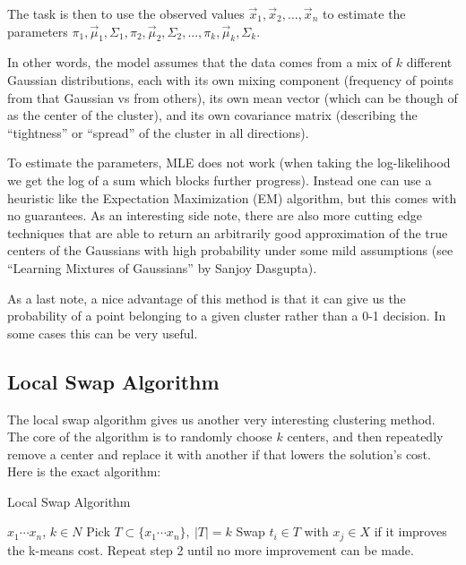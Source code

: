   The task is then to use the observed values $\vec{x}_1, \vec{x}_2, \dots, \vec{x}_n$ to
  estimate the parameters $\pi_1, \vec{\mu}_1, \Sigma_1, \pi_2, \vec{\mu}_2, {\Sigma_2}, ..., \pi_k, \vec{\mu}_k, {\Sigma_k}$.
  
  In other words, the model assumes that the data comes from a mix of $k$ different Gaussian distributions, each with its own mixing component (frequency of points from that
  Gaussian vs from others), its own mean vector (which can be though of as the center of the cluster), and its own covariance matrix (describing the ``tightness'' or ``spread'' of the 
  cluster in all directions).
  
  To estimate the parameters, MLE does not work (when taking the log-likelihood we get the log of a sum which blocks further progress). Instead one can use a heuristic like the 
  Expectation Maximization (EM) algorithm, but this comes with no guarantees. 
  As an interesting side note, there are also more cutting edge techniques that are able to return an arbitrarily good approximation of the true centers 
  of the Gaussians 
  with high probability under some mild assumptions (see ``Learning Mixtures of Gaussians'' by Sanjoy Dasgupta).
  
  As a last note, a nice advantage of this method is that it can give us the probability of a point belonging to a given cluster rather than a 0-1 decision. In some cases this can be very useful.

\subsection{Local Swap Algorithm}	
	The local swap algorithm gives us another very interesting clustering method. The core of the algorithm is to randomly choose $k$ centers,
  and then repeatedly remove a center and replace it with another if that lowers the solution's cost. Here is the exact
  algorithm:
	
\begin{algorithm}[H]
  \caption{Local Swap Algorithm}
  \label{ladder-mechanism}
  \begin{algorithmic}[1]
    \renewcommand\algorithmicrequire{\textbf{input}} 
    \REQUIRE ${x_1\cdots x_n}$, $k\in N$   
    \STATE Pick $T\subset \{x_1\cdots x_n\},\ |T|=k$ 
    \STATE Swap $t_i\in T$ with $x_j\in X$ if it improves the k-means cost.
    \STATE Repeat step 2 until no more improvement can be made.
  \end{algorithmic}
\end{algorithm}

